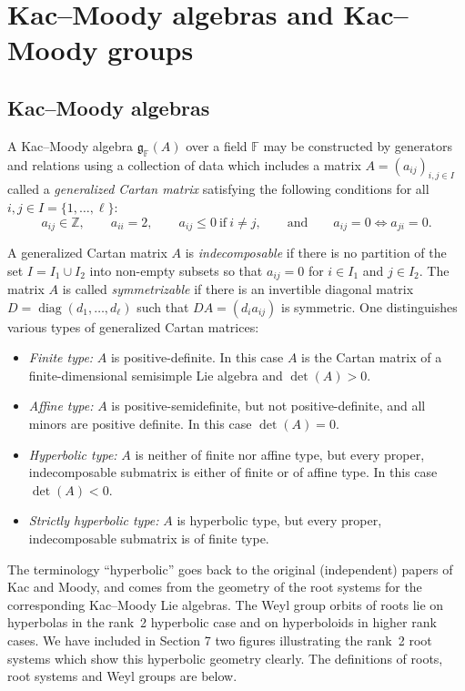 \documentclass[11pt]{article}
\numberwithin{equation}{section}
\numberwithin{equation}{section}
\def\F{{\mathbb F}}
\def\Z{\mathbb{Z}}
\begin{document}
\section{Kac--Moody algebras and Kac--Moody groups}

\subsection{Kac--Moody algebras}\label{subsection:Kac--Moody-algebra}

\noindent A Kac--Moody algebra $\mathfrak{g}_{\F}(A)$ over a field $\F$ may be constructed by generators and relations using a collection of data which includes a matrix $A=(a_{ij})_{i,j\in I}$ called a {\it generalized Cartan matrix} satisfying the following conditions for all $i,j\in I=\{1,\dots ,\ell\}$:
\[a_{ij}\in{\Z}, \qquad a_{ii}=2, \qquad a_{ij}\leq 0 \ \text{if} \ i\neq j, \qquad\text{and}\qquad a_{ij}=0 \iff a_{ji}=0. \]

A generalized Cartan matrix $A$ is {\it indecomposable} if there is no partition of the set $I = I_1\cup I_2$ into non-empty subsets
so that $a_{ij}=0$ for $i\in I_1$ and $j\in I_2$. The matrix $A$ is called {\it symmetrizable} if there is an invertible diagonal matrix
$D = \operatorname{diag}(d_1,\dots,d_\ell)$ such that $DA=(d_i a_{ij})$ is symmetric. One distinguishes various types of generalized Cartan matrices:
\begin{itemize}\itemsep=0pt
 \item[--] {\it Finite type:} $A$ is positive-definite. In this case $A$ is the Cartan matrix of a finite-dimensional semisimple Lie algebra and $\det(A)>0$.
 \item[--] {\it Affine type:} $A$ is positive-semidefinite, but not positive-definite, and all minors are positive definite. In this case $\det(A)=0$.
 \item[--] {\it Hyperbolic type:} $A$ is neither of finite nor affine type, but every proper, indecomposable submatrix is either of finite or of affine type. In this case $\det(A)<0$.
 \item[--] {\it Strictly hyperbolic type:} $A$ is hyperbolic type, but every proper, indecomposable submatrix is of finite type.
\end{itemize}

The terminology ``hyperbolic'' goes back to the original (independent) papers of Kac and Moody, and comes from the
geometry of the root systems for the corresponding Kac--Moody Lie algebras. The Weyl group orbits of roots lie on hyperbolas in the
rank~2 hyperbolic case and on hyperboloids in higher rank cases. We have included in Section 7 two figures illustrating the rank~2 root
systems which show this hyperbolic geometry clearly. The definitions of roots, root systems and Weyl groups are below.
\end{document}
